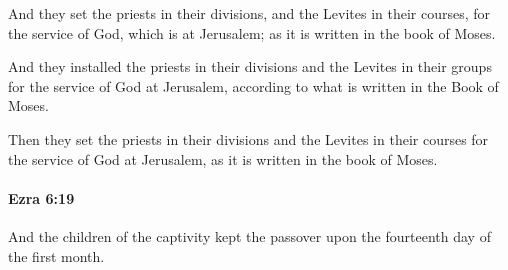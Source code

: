 			\begin{versebox}
					\item[BHS] 
					\item[LXX] 
					\item[ASV] And they set the priests in their divisions, and the Levites in their courses, for the service of God, which is at Jerusalem; as it is written in the book of Moses.
					\item[NIV] And they installed the priests in their divisions and the Levites in their groups for the service of God at Jerusalem, according to what is written in the Book of Moses.
					\item[NRSV] Then they set the priests in their divisions and the Levites in their courses for the service of God at Jerusalem, as it is written in the book of Moses.
			\end{versebox}

		\paragraph{Ezra 6:19} %
			\label{EZRA-6-19}

			And the children of the captivity kept the passover upon the fourteenth day of the first month.

